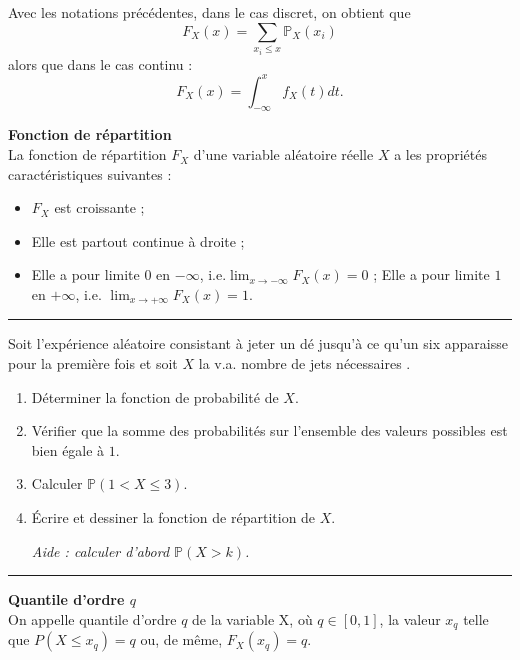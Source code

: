 \documentclass[../PolyS4.tex]{subfiles}
\begin{document}
\begin{Prop}
Avec les notations précédentes, dans le cas discret, on obtient que
$$F_X (x) = \sum_{x_i\leq x} \mathbb{P}_X (x_i)$$
alors que dans le cas continu :
$$F_X (x) =
\int^x_{-\infty}
f_X (t) dt.$$
\end{Prop}



\begin{Thm}
\textbf{Fonction de répartition}\\
 La fonction de répartition $F_X$ d'une variable aléatoire réelle $X$ a les propriétés caractéristiques suivantes :
\begin{itemize}
  \item  $F_X$ est croissante ;
   \item Elle est partout continue à droite ;
     \item Elle a pour limite $0$ en $\displaystyle -\infty $, i.e.$\displaystyle \lim _{x\to -\infty }F_{X}(x)=0$ ;
    Elle a pour limite $1$ en $\displaystyle +\infty $, i.e. $\displaystyle \lim _{x\to +\infty }F_{X}(x)=1$.
    \end{itemize}
\end{Thm}


\vspace{1em}
\hrule
\vspace{1em}


Soit l'expérience aléatoire consistant à jeter un dé jusqu'à ce qu'un six apparaisse pour la première fois et soit $X$ la v.a. \og nombre de jets nécessaires\fg{} . 

\begin{enumerate}
\item Déterminer la fonction de probabilité de $X$.
\item Vérifier que la somme des probabilités sur l'ensemble des valeurs possibles est bien égale à $1$. 
\item Calculer $\mathbb{P}(1 < X \leq 3)$.
\item Écrire et dessiner la fonction de répartition de $X$.

\textit{Aide : calculer d'abord $\mathbb{P}(X > k)$.}
\end{enumerate}

\vspace{1em}
\hrule
\vspace{1em}


\begin{Def}
{\textbf{Quantile d'ordre $q$}\\}
On appelle quantile d'ordre $q$ de la variable X, o\`u $q \in [0, 1]$,
la valeur $x_q$ telle que $P(X \leq x_q) = q$ ou, de m\^eme, $F_X(x_q) = q$.
\end{Def}
\end{document}
